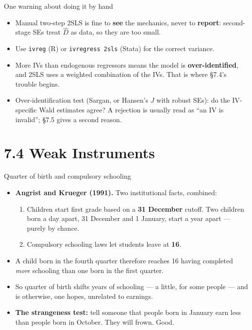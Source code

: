 \documentclass[
  11pt,
  ignorenonframetext,
  aspectratio=169,
]{beamer}
\providecommand{\tightlist}{%
  \setlength{\itemsep}{0pt}\setlength{\parskip}{0pt}}
\begin{document}
\begin{frame}[fragile]{One warning about doing it by hand}
\protect{}\label{one-warning-about-doing-it-by-hand}
\begin{itemize}
\tightlist
\item
  Manual two-step 2SLS is fine to \textbf{see} the mechanics, never to
  \textbf{report}: second-stage SEs treat \(\hat D\) as data, so they
  are too small.
\item
  Use \texttt{ivreg} (R) or \texttt{ivregress\ 2sls} (Stata) for the
  correct variance.
\item
  More IVs than endogenous regressors means the model is
  \textbf{over-identified}, and 2SLS uses a weighted combination of the
  IVs. That is where §7.4's trouble begins.
\item
  Over-identification test (Sargan, or Hansen's \(J\) with robust SEs):
  do the IV-specific Wald estimates agree? A rejection is usually read
  as ``an IV is invalid''; §7.5 gives a second reason.
\end{itemize}
\end{frame}

\section{7.4 Weak Instruments}\label{weak-instruments}

\begin{frame}{Quarter of birth and compulsory schooling}
\protect{}\label{quarter-of-birth-and-compulsory-schooling}
\begin{itemize}
\tightlist
\item
  \textbf{Angrist and Krueger (1991).} Two institutional facts,
  combined:

  \begin{enumerate}
  \tightlist
  \item
    Children start first grade based on a \textbf{31 December} cutoff.
    Two children born a day apart, 31 December and 1 January, start a
    year apart --- purely by chance.
  \item
    Compulsory schooling laws let students leave at \textbf{16}.
  \end{enumerate}
\item
  A child born in the fourth quarter therefore reaches 16 having
  completed \emph{more} schooling than one born in the first quarter.
\item
  So quarter of birth shifts years of schooling --- a little, for some
  people --- and is otherwise, one hopes, unrelated to earnings.
\item
  \textbf{The strangeness test:} tell someone that people born in
  January earn less than people born in October. They will frown. Good.
\end{itemize}
\end{frame}
\end{document}

